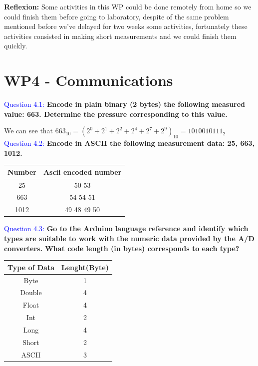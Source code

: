 \documentclass[12pt, a4papre]{article}
\begin{document}
	\textbf{Reflexion: }Some activities in this WP could be done remotely from home so we could finish them before going to laboratory, despite of the same problem mentioned before we’ve delayed for two weeks some activities, fortunately these activities consisted in making short measurements and we could finish them quickly.
	\newpage
	\section{WP4 - Communications}
	
	\textcolor{blue}{Question 4.1:} \textbf{Encode in plain binary (2 bytes) the following measured value: 663. Determine the pressure corresponding to this value.}
	
	We can see that $663_{10} = (2^0 + 2^1 + 2^2 + 2^4 + 2^7 + 2^9)_{10} = 1010010111_2$\\

	\textcolor{blue}{Question 4.2:}  \textbf{Encode in ASCII the following measurement data: 25, 663, 1012.}

	\begin{table}[H]
	\centering
	\begin{tabular}{||c c ||} 
	 \hline
		Number & Ascii encoded number \\ [0.5ex] 
	 \hline\hline
	 	 25		& 50 53  \\
		 663		& 54 54 51  \\ 
		 1012 	& 49 48 49 50  \\ 
	 \hline
	\end{tabular}
	\end{table}
		
	\textcolor{blue}{Question 4.3:} \textbf{Go to the Arduino language reference and identify which types are suitable to work with the numeric data provided by the A/D converters. What code length (in bytes) corresponds to each type?}
	
	\begin{table}[H]
	\centering
	\begin{tabular}{||c c ||} 
	 \hline
		Type of Data & Lenght(Byte) \\ [0.5ex] 
	 \hline\hline
	 	 Byte		& 1  \\
		 Double	& 4  \\ 
		 Float 	& 4  \\ 
		 Int 		& 2  \\
		 Long 	& 4  \\ 
		 Short 	& 2  \\
		 ASCII 	& 3  \\ 
	 \hline
	\end{tabular}
	\end{table}
\end{document}
